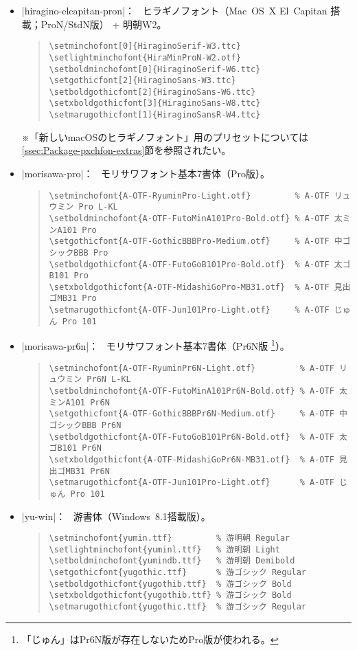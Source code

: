 \documentclass[uplatex,dvipdfmx,a4paper]{jsarticle}
\newcommand{\Note}{\par\noindent ※}
\newcommand{\Means}{：\ }
\begin{document}
\begin{itemize}
\item |hiragino-elcapitan-pron|\Means
  ヒラギノフォント（Mac~OS~X El~Capitan 搭載；ProN/StdN版） + 明朝W2。
\begin{quote}\small\begin{verbatim}
\setminchofont[0]{HiraginoSerif-W3.ttc}
\setlightminchofont{HiraMinProN-W2.otf}
\setboldminchofont[0]{HiraginoSerif-W6.ttc}
\setgothicfont[2]{HiraginoSans-W3.ttc}
\setboldgothicfont[2]{HiraginoSans-W6.ttc}
\setxboldgothicfont[3]{HiraginoSans-W8.ttc}
\setmarugothicfont[1]{HiraginoSansR-W4.ttc}
\end{verbatim}\end{quote}
\Note 「新しいmacOSのヒラギノフォント」用のプリセットについては
  \ref{ssec:Package-pxchfon-extras}節を参照されたい。

\item |morisawa-pro|\Means
  モリサワフォント基本7書体（Pro版）。
\begin{quote}\small\begin{verbatim}
\setminchofont{A-OTF-RyuminPro-Light.otf}         % A-OTF リュウミン Pro L-KL
\setboldminchofont{A-OTF-FutoMinA101Pro-Bold.otf} % A-OTF 太ミンA101 Pro
\setgothicfont{A-OTF-GothicBBBPro-Medium.otf}     % A-OTF 中ゴシックBBB Pro
\setboldgothicfont{A-OTF-FutoGoB101Pro-Bold.otf}  % A-OTF 太ゴB101 Pro
\setxboldgothicfont{A-OTF-MidashiGoPro-MB31.otf}  % A-OTF 見出ゴMB31 Pro
\setmarugothicfont{A-OTF-Jun101Pro-Light.otf}     % A-OTF じゅん Pro 101
\end{verbatim}\end{quote}

\item |morisawa-pr6n|\Means
  モリサワフォント基本7書体（Pr6N版
  \footnote{「じゅん」はPr6N版が存在しないためPro版が使われる。}）。
\begin{quote}\small\begin{verbatim}
\setminchofont{A-OTF-RyuminPr6N-Light.otf}         % A-OTF リュウミン Pr6N L-KL
\setboldminchofont{A-OTF-FutoMinA101Pr6N-Bold.otf} % A-OTF 太ミンA101 Pr6N
\setgothicfont{A-OTF-GothicBBBPr6N-Medium.otf}     % A-OTF 中ゴシックBBB Pr6N
\setboldgothicfont{A-OTF-FutoGoB101Pr6N-Bold.otf}  % A-OTF 太ゴB101 Pr6N
\setxboldgothicfont{A-OTF-MidashiGoPr6N-MB31.otf}  % A-OTF 見出ゴMB31 Pr6N
\setmarugothicfont{A-OTF-Jun101Pro-Light.otf}      % A-OTF じゅん Pro 101
\end{verbatim}\end{quote}

\item |yu-win|\Means
  游書体（Windows~8.1搭載版）。
\begin{quote}\small\begin{verbatim}
\setminchofont{yumin.ttf}         % 游明朝 Regular
\setlightminchofont{yuminl.ttf}   % 游明朝 Light
\setboldminchofont{yumindb.ttf}   % 游明朝 Demibold
\setgothicfont{yugothic.ttf}      % 游ゴシック Regular
\setboldgothicfont{yugothib.ttf}  % 游ゴシック Bold
\setxboldgothicfont{yugothib.ttf} % 游ゴシック Bold
\setmarugothicfont{yugothic.ttf}  % 游ゴシック Regular
\end{verbatim}\end{quote}


\end{itemize}
\end{document}
